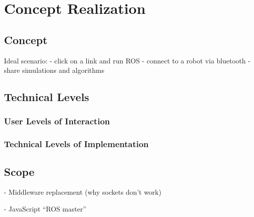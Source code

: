 \chapter{Concept Realization}\label{cha:concept}


\section{Concept}\label{sec:concept}

Ideal scenario: 
- click on a link and run ROS
- connect to a robot via bluetooth
- share simulations and algorithms

\section{Technical Levels}\label{sec:levels}

    \subsection{User Levels of Interaction}\label{sub:user_levels}

    \subsection{Technical Levels of Implementation}\label{sub:tech_levels}

\section{Scope}\label{sec:scope}

    - Middleware replacement (why sockets don't work)

    - JavaScript ``ROS master''

